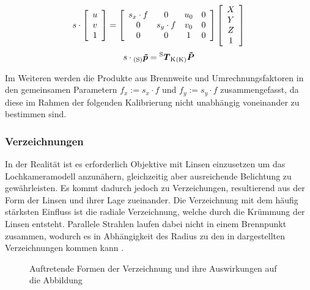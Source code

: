 \begin{equation}
s \cdot 
\mat{c}{
u\\
v\\
1
}
= 
\mat{cccc}{
s_x \cdot f & 0 & u_0 & 0\\
0 & s_y \cdot f & v_0 & 0\\
0 & 0 & 1 & 0
}
\mat{c}{
X\\
Y\\
Z\\
1
}
\label{eq.intrinsic}
\end{equation}
\begin{equation}
s \cdot {_{{\mathrm{(S)}}}}\mbox{\boldmath{$\tilde{p}$}} = {^{\mathrm{S}}\mbox{\boldmath{$T$}}_{\mathrm{K}}}{_{{\mathrm{(K)}}}}\mbox{\boldmath{$\tilde{P}$}}
\end{equation}

Im Weiteren werden die Produkte aus Brennweite und Umrechnungsfaktoren in den gemeinsamen Parametern $f_x := s_x \cdot f$ und $f_y := s_y \cdot f$ zusammengefasst, da diese im Rahmen der folgenden Kalibrierung nicht unabhängig voneinander zu bestimmen sind.

\subsubsection{Verzeichnungen}
In der Realität ist es erforderlich Objektive mit Linsen einzusetzen um das Lochkameramodell anzunähern, gleichzeitig aber ausreichende Belichtung zu gewährleisten. Es kommt dadurch jedoch zu Verzeichungen, resultierend aus der Form der Linsen und ihrer Lage zueinander. Die Verzeichnung mit dem häufig stärksten Einfluss ist die radiale Verzeichnung, welche durch die Krümmung der Linsen entsteht. Parallele Strahlen laufen dabei nicht in einem Brennpunkt zusammen, wodurch es in Abhängigkeit des Radius zu den in  dargestellten Verzeichnungen kommen kann .

\begin{figure}[!ht]
	\begin{center}
	\hspace{4mm}
	\hspace{4mm}
	\caption{Auftretende Formen der Verzeichnung und ihre Auswirkungen auf die Abbildung}
	\label{fig.distortions}
	\end{center}
\end{figure}

